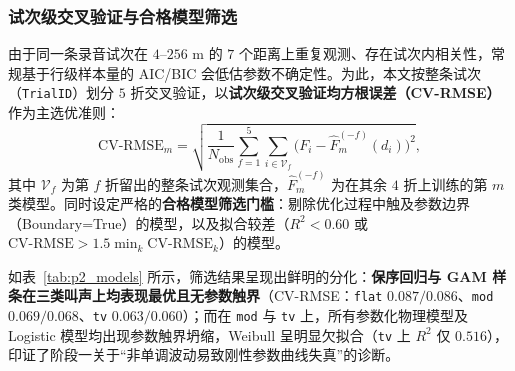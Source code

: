 \documentclass{apmcmthesis}
\begin{document}
\subsubsection{试次级交叉验证与合格模型筛选}

由于同一条录音试次在 $4\text{--}256\text{ m}$ 的 $7$ 个距离上重复观测、存在试次内相关性，常规基于行级样本量的 AIC/BIC 会低估参数不确定性。为此，本文按整条试次（\texttt{TrialID}）划分 $5$ 折交叉验证，以\textbf{试次级交叉验证均方根误差（CV-RMSE）}作为主选优准则：
\begin{equation}
    \text{CV-RMSE}_m = \sqrt{\frac{1}{N_{\text{obs}}}\sum_{f=1}^{5}\sum_{i \in \mathcal{V}_f}\bigl(F_i - \hat{F}_m^{(-f)}(d_i)\bigr)^2},
\end{equation}
其中 $\mathcal{V}_f$ 为第 $f$ 折留出的整条试次观测集合，$\hat{F}_m^{(-f)}$ 为在其余 $4$ 折上训练的第 $m$ 类模型。同时设定严格的\textbf{合格模型筛选门槛}：剔除优化过程中触及参数边界（Boundary=True）的模型，以及拟合较差（$R^2 < 0.60$ 或 $\text{CV-RMSE} > 1.5\min_k \text{CV-RMSE}_k$）的模型。

如表~\ref{tab:p2_models} 所示，筛选结果呈现出鲜明的分化：\textbf{保序回归与 GAM 样条在三类叫声上均表现最优且无参数触界}（CV-RMSE：\texttt{flat} $0.087 / 0.086$、\texttt{mod} $0.069 / 0.068$、\texttt{tv} $0.063 / 0.060$）；而在 \texttt{mod} 与 \texttt{tv} 上，所有参数化物理模型及 Logistic 模型均出现参数触界坍缩，Weibull 呈明显欠拟合（\texttt{tv} 上 $R^2$ 仅 $0.516$），印证了阶段一关于``非单调波动易致刚性参数曲线失真''的诊断。
\end{document}
